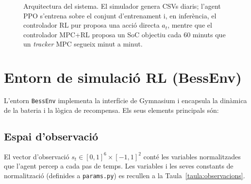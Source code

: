 \documentclass[a4paper,12pt,twoside]{ThesisStyle}
\begin{document}
\begin{figure}[htb]
\centering
{}
\caption{Arquitectura del sistema. El simulador genera CSVs diaris; l'agent PPO s'entrena sobre el conjunt d'entrenament i, en inferència, el controlador RL pur proposa una acció directa $a_t$, mentre que el controlador MPC+RL proposa un SoC objectiu cada 60 minuts que un \textit{tracker} MPC segueix minut a minut.}
\label{fig:arquitectura}
\end{figure}

\section{Entorn de simulació RL (BessEnv)}

L'entorn \texttt{BessEnv} implementa la interfície de Gymnasium i encapsula la dinàmica de la bateria i la lògica de recompensa. Els seus elements principals són:

\subsection{Espai d'observació}

El vector d'observació $s_t \in [0, 1]^6 \times [-1, 1]^2$ conté les variables normalitzades que l'agent percep a cada pas de temps. Les variables i les seves constants de normalització (definides a \texttt{params.py}) es recullen a la Taula~\ref{taula:observacions}.
\end{document}
